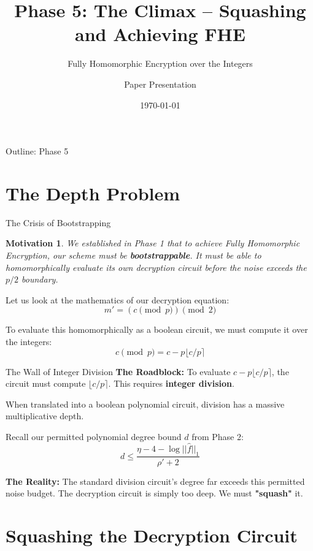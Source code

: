 \documentclass[10pt, aspectratio=169]{beamer}
\title[Phase 5: The Climax]{Phase 5: The Climax -- Squashing and Achieving FHE}
\subtitle{Fully Homomorphic Encryption over the Integers}
\author{Paper Presentation}
\date{\today}
\newtheorem{motivation}{Motivation}
\begin{document}
\frame{\titlepage}

\begin{frame}{Outline: Phase 5}
    \tableofcontents
\end{frame}

\section{The Depth Problem}

\begin{frame}{The Crisis of Bootstrapping}
    \begin{motivation}
    We established in Phase 1 that to achieve Fully Homomorphic Encryption, our scheme must be \textbf{bootstrappable}. It must be able to homomorphically evaluate its own decryption circuit before the noise exceeds the $p/2$ boundary.
    \end{motivation}
    \pause
    
    \vspace{0.3cm}
    Let us look at the mathematics of our decryption equation:
    $$m' = (c \pmod p) \pmod 2$$
    \pause
    
    To evaluate this homomorphically as a boolean circuit, we must compute it over the integers:
    $$c \pmod p = c - p \lfloor c/p \rceil$$
\end{frame}

\begin{frame}{The Wall of Integer Division}
    \textbf{The Roadblock:}
    To evaluate $c - p \lfloor c/p \rceil$, the circuit must compute $\lfloor c/p \rceil$. This requires \textbf{integer division}. 
    \pause
    
    \vspace{0.3cm}
    When translated into a boolean polynomial circuit, division has a massive multiplicative depth. 
    \pause
    
    \vspace{0.3cm}
    Recall our permitted polynomial degree bound $d$ from Phase 2:
    $$d \le \frac{\eta - 4 - \log||\hat{f}||_1}{\rho' + 2}$$
    \pause
    
    \textbf{The Reality:} The standard division circuit's degree far exceeds this permitted noise budget. The decryption circuit is simply too deep. We must \textbf{"squash"} it.
\end{frame}

\section{Squashing the Decryption Circuit}
\end{document}
